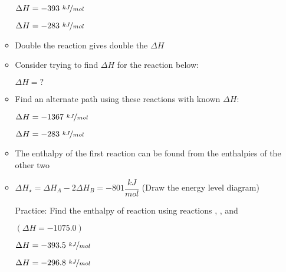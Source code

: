 \documentclass[12pt, openany, letterpaper]{memoir}
\begin{document}
\begin{itemize}
\begin{itemize}
           \hspace{2em} $\Delta H=-393~\nicefrac{kJ}{mol}$

           \hspace{2em} $\Delta H=-283~\nicefrac{kJ}{mol}$

    \item Double the reaction gives double the $\Delta H$
    \item Consider trying to find $\Delta H$ for the reaction below:

          \circled{$\star$}  \hspace{2em} $\Delta H = ?$
    \item Find an alternate path using these reactions with known $\Delta H$:

            \hspace{2em} $\Delta H=-1367~\nicefrac{kJ}{mol}$

            \hspace{2em} $\Delta H=-283~\nicefrac{kJ}{mol}$
    \item The enthalpy of the first reaction can be found from the enthalpies of the other two
    \item $\Delta H_{\star} = \Delta H_A - 2 \Delta H_B = -801\dfrac{kJ}{mol}$ \hspace{1em} (Draw the energy level diagram)

          Practice: Find the enthalpy of reaction \circled{$\star$} using reactions , , and 

          \circled{$\star$}  \hspace{2em} $\left(\Delta H = -1075.0\right)$

            \hspace{2em} $\Delta H=-393.5~\nicefrac{kJ}{mol}$

            \hspace{2em} $\Delta H=-296.8~\nicefrac{kJ}{mol}$


\end{itemize}
\end{itemize}
\end{document}
